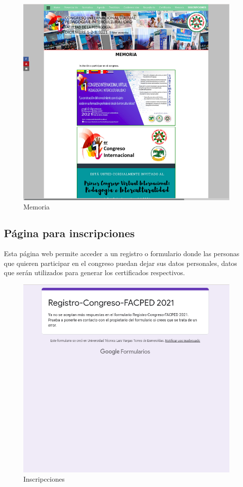 \documentclass[a4paper,14px]{article}
\begin{document}
\begin{figure}[H]
  \centering
  \includegraphics[scale=0.6]{memoria.png}
  \caption{Memoria}
  \label{fig:arquitectura}
\end{figure}

\newpage
\subsection{Página para inscripciones }
\label{sec:pagina-principal}

Esta página web permite acceder a un registro o formulario donde las personas que quieren participar en el congreso puedan dejar sus datos personales, datos que serán utilizados para generar los certificados respectivos.



\begin{figure}[H]
  \centering
  \includegraphics[scale=0.6]{inscripcion.png}
  \caption{Inscripcciones}
  \label{fig:arquitectura}
\end{figure}
\end{document}
